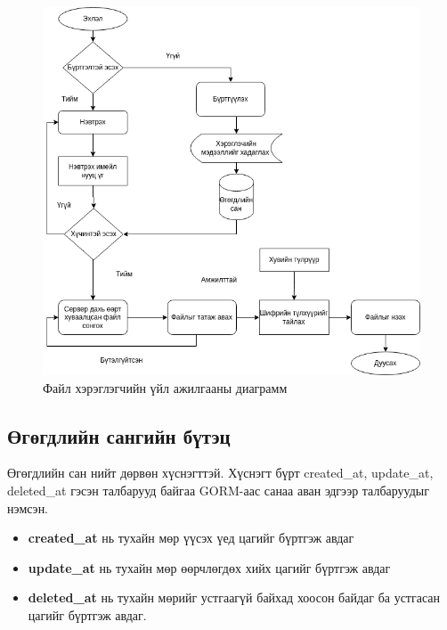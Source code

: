 \begin{figure}[H]
    \centering
    \includegraphics[scale=0.5]{Figures/delegatee.drawio.png}
    \caption[pyUmbral]{Файл хэрэглэгчийн үйл ажилгааны диаграмм}
    \label{fig:delegatee_diagram}
\end{figure}

\subsection*{Өгөгдлийн сангийн бүтэц}
Өгөгдлийн сан нийт дөрвөн хүснэгттэй. Хүснэгт бүрт created\_at, update\_at, deleted\_at гэсэн талбарууд байгаа GORM-аас санаа аван эдгээр талбаруудыг нэмсэн. 

\begin{itemize}
    \item \textbf{created\_at} нь тухайн мөр үүсэх үед цагийг бүртгэж авдаг
    \item \textbf{update\_at} нь тухайн мөр өөрчлөгдөх хийх цагийг бүртгэж авдаг
    \item \textbf{deleted\_at} нь тухайн мөрийг устгаагүй байхад хоосон байдаг ба устгасан цагийг бүртгэж авдаг.
\end{itemize}

